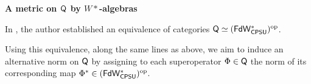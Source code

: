 \begin{comment}
\end{remark}

\begin{definition} \label{def:tensor} [\emph{Tensor Product }]
  For signatures $\sigma = n_1, \ldots, n_s $ and $\tau= m_1, \ldots, m_t $, the tensor product of $\sigma$ and $\tau$ is defined as $\sigma \otimes \tau = n_1 m_1, \ldots ,n_1 m_t, \ldots, n_s m_1,...,n_s m_t$. 
  The morphism part of the tensor product follows the definition in the category of vector spaces. If $\Phi: \sigma \rightarrow \tau$ and $\Psi: \sigma' \rightarrow  \tau'$, then their tensor product $\Psi \otimes \Phi: \sigma \otimes \sigma' \rightarrow  \tau \otimes \tau' $ is 
the Kronecker product of their matrices representation, \ie,
\begin{align*}
  \Phi \otimes \Psi = 
  \begin{pmatrix}
  \Phi_{11} \otimes \Psi_{11} & \ldots & \Phi_{11} \otimes \Psi_{s'1} & \ldots   & \Phi_{s1} \otimes \Psi_{11} & \ldots & \Phi_{s1} \otimes \Psi_{s'1} \\
  \vdots & & & & & & \vdots \\
  \Phi_{1t} \otimes \Psi_{1t'} & \ldots & \Phi_{1t} \otimes \Psi_{s't'} & \ldots   & \Phi_{st} \otimes \Psi_{1t'} & \ldots & \Phi_{st} \otimes \Psi_{s't'}
\end{pmatrix}
\end{align*}



 Moreover, $\dist$ is an identity map:
  \[ (\sigma \oplus \sigma') \otimes \tau = (\sigma \otimes \tau ) \oplus (\sigma' \otimes \tau ) \]

  
\end{definition}


The category $\catQ$ is a distributive symmetric monoidal category with binary coproducts. However, this category is not closed \cite{selinger2004b}.

\end{comment}

\textbf{A metric on $\mathsf{Q}$ by $W*$-algebras}


In \cite{choSemanticsQuantumProgramming2016}, the author established an equivalence of categories  
$\mathsf{Q} \simeq (\mathsf{FdW^*_{CPSU}})^{\mathrm{op}}$.  

Using this equivalence, along the same lines as above, we aim to induce an alternative norm on $\mathsf{Q}$ by assigning to each superoperator $\Phi \in \mathsf{Q}$ the norm of its corresponding map $\Phi^* \in (\mathsf{FdW^*_{CPSU}})^{\mathrm{op}}$. %

